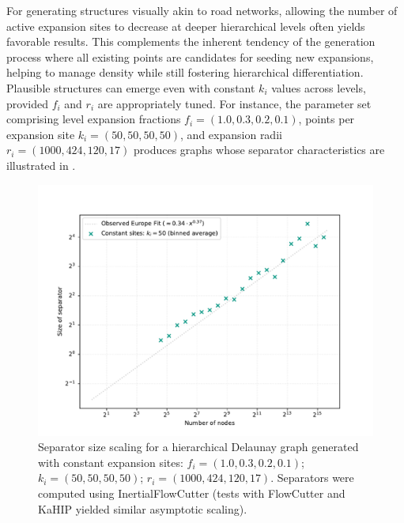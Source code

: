For generating structures visually akin to road networks, allowing the number of active expansion sites to decrease at deeper hierarchical levels often yields favorable results.
This complements the inherent tendency of the generation process where all existing points are candidates for seeding new expansions, helping to manage density while still fostering hierarchical differentiation.
Plausible structures can emerge even with constant \(k_i\) values across levels, provided \(f_i\) and \(r_i\) are appropriately tuned.
For instance, the parameter set comprising level expansion fractions \(f_i = (1.0, 0.3, 0.2, 0.1)\), points per expansion site \(k_i = (50, 50, 50, 50)\), and expansion radii \(r_i = (1000, 424, 120, 17)\) produces graphs whose separator characteristics are illustrated in .

\begin{figure}[tbhp]
	\centering
	\includegraphics[width=0.7\linewidth]{graphics/hierachcial_delaunay_const_sites.pdf}
	\caption{Separator size scaling for a hierarchical Delaunay graph generated with constant expansion sites: \(f_i=(1.0, 0.3, 0.2, 0.1)\); \(k_i=(50, 50, 50, 50)\); \(r_i=(1000, 424, 120, 17)\). Separators were computed using InertialFlowCutter (tests with FlowCutter and KaHIP yielded similar asymptotic scaling).}
	\label{fig:hier_delaunay_example_params_sep}
\end{figure}

